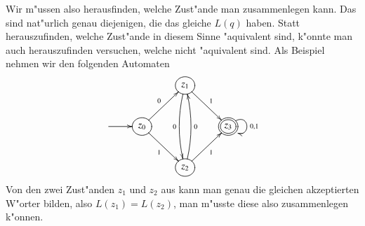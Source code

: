 Wir m"ussen also herausfinden, welche Zust"ande man zusammenlegen
kann. Das sind nat"urlich genau diejenigen, die das gleiche $L(q)$
haben.
Statt herauszufinden, welche Zust"ande in diesem Sinne "aquivalent
sind, k"onnte man auch herauszufinden versuchen, welche nicht "aquivalent
sind. Als Beispiel nehmen wir den folgenden Automaten
\[
\entrymodifiers={++[o][F]}
\xymatrix{
*+\txt{}
	&*+\txt{}
		&{z_1}\ar@/_/[dd]_{0} \ar[dr]^{1}
\\
*+\txt{} \ar[r]
	&{z_0}\ar[ur]^{0} \ar[dr]_1
		&*+\txt{}
			&*++[o][F=]{z_3}\ar@(ur,dr)^{0,1}
\\
*+\txt{}
	&*+\txt{}
		&{z_2} \ar@/_/[uu]_{0} \ar[ur]_{1}
}
\]
Von den zwei Zust"anden $z_1$ und $z_2$ aus kann man genau die gleichen
akzeptierten W"orter bilden, also $L(z_1)=L(z_2)$, man m"usste diese
also zusammenlegen k"onnen.


